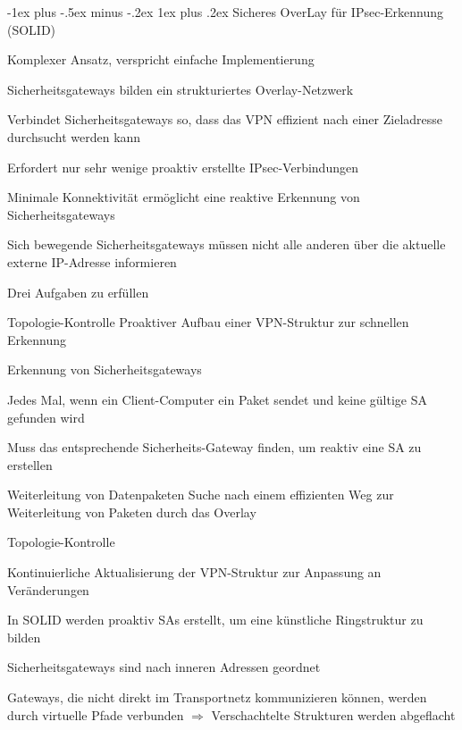 \documentclass[a4paper]{article}
\makeatletter
\renewcommand{\subsubsection}{\@startsection{subsubsection}{3}{0mm}%
 {-1ex plus -.5ex minus -.2ex}%
 {1ex plus .2ex}%
 {\normalfont\small\bfseries}}
\makeatother
\begin{document}
\begin{multicols}{3}
      \subsubsection{Sicheres OverLay für IPsec-Erkennung (SOLID)}
      \begin{itemize*}
            \item Komplexer Ansatz, verspricht einfache Implementierung
            \item Sicherheitsgateways bilden ein strukturiertes Overlay-Netzwerk
            \item Verbindet Sicherheitsgateways so, dass das VPN effizient nach einer Zieladresse durchsucht werden kann
            \item Erfordert nur sehr wenige proaktiv erstellte IPsec-Verbindungen
            \begin{itemize*}
                  \item Minimale Konnektivität ermöglicht eine reaktive Erkennung von Sicherheitsgateways
                  \item Sich bewegende Sicherheitsgateways müssen nicht alle anderen über die aktuelle externe IP-Adresse informieren
            \end{itemize*}
            \item Drei Aufgaben zu erfüllen
      \end{itemize*}
      \begin{description*}
            \item[Topologie-Kontrolle] Proaktiver Aufbau einer VPN-Struktur zur schnellen Erkennung
            \item[Erkennung von Sicherheitsgateways]
            \begin{itemize*}
                  \item Jedes Mal, wenn ein Client-Computer ein Paket sendet und keine gültige SA gefunden wird
                  \item Muss das entsprechende Sicherheits-Gateway finden, um reaktiv eine SA zu erstellen
            \end{itemize*}
            \item[Weiterleitung von Datenpaketen] Suche nach einem effizienten Weg zur Weiterleitung von Paketen durch das Overlay
      \end{description*}

      Topologie-Kontrolle
      \begin{itemize*}
            \item Kontinuierliche Aktualisierung der VPN-Struktur zur Anpassung an Veränderungen
            \item In SOLID werden proaktiv SAs erstellt, um eine künstliche Ringstruktur zu bilden
            \item Sicherheitsgateways sind nach inneren Adressen geordnet
            \item Gateways, die nicht direkt im Transportnetz kommunizieren können, werden durch virtuelle Pfade verbunden $\Rightarrow$ Verschachtelte Strukturen werden abgeflacht%
      \end{itemize*}


\end{multicols}
\end{document}
